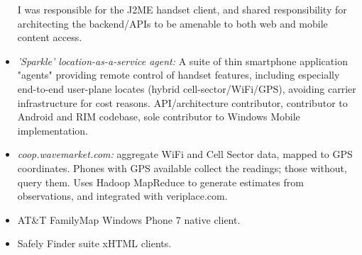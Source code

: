 \begin{itemize}
          I was responsible for the J2ME handset client,
          and shared responsibility for architecting the backend/APIs to be amenable
          to both web and mobile content access.\\[-18pt]
         \item {\em 'Sparkle' location-as-a-service agent:} A suite of thin smartphone application 
           "agents" 
          providing remote control of handset features, including especially end-to-end 
          user-plane locates (hybrid cell-sector/WiFi/GPS), avoiding carrier 
          infrastructure for cost reasons.  API/architecture contributor, contributor to 
          Android and RIM codebase, sole contributor to Windows Mobile implementation. \\[-18pt]
         \item  {\em coop.wavemarket.com:} aggregate WiFi and Cell Sector data, mapped to GPS 
         coordinates.  Phones with GPS available collect the readings; those without, query them. 
         Uses Hadoop MapReduce to generate estimates from observations, and integrated with 
         veriplace.com.  \\[-18pt]
        \item  AT\&T FamilyMap Windows Phone 7 native client. \\[-18pt]
        \item  Safely Finder suite xHTML clients. \\[-5pt]
       \end{itemize}
       
